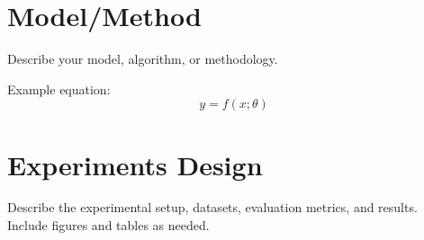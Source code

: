 \documentclass{article}
\begin{document}
\section{Model/Method}
Describe your model, algorithm, or methodology.

Example equation:
\begin{equation}
    y = f(x; \theta)
\end{equation}




\section{Experiments Design}
Describe the experimental setup, datasets, evaluation metrics, and results.
Include figures and tables as needed.



\end{document}
